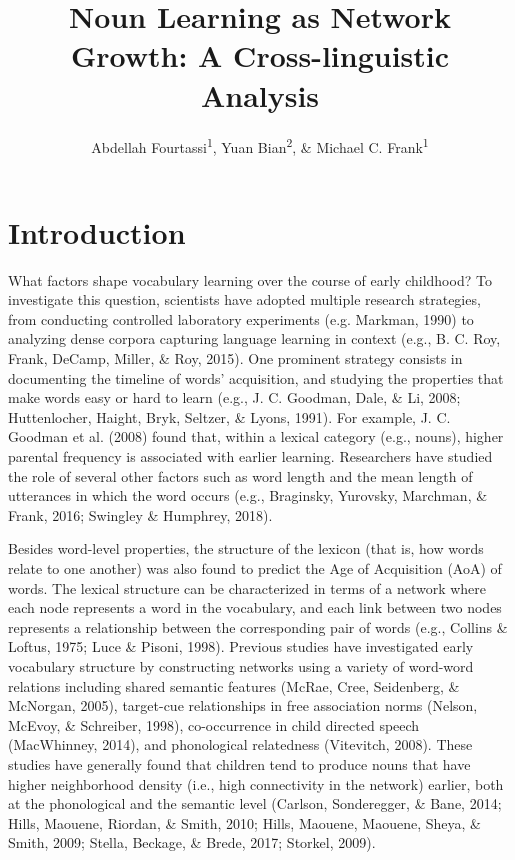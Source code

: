 \documentclass[english,floatsintext,man]{apa6}
\title{Noun Learning as Network Growth: A Cross-linguistic Analysis}
\author{Abdellah Fourtassi\textsuperscript{1}, Yuan Bian\textsuperscript{2}, \& Michael C. Frank\textsuperscript{1}}
\affiliation{
    \vspace{0.5cm}
          \textsuperscript{1} Department of Psychology, Stanford University\\
          \textsuperscript{2} Department of Psychology, University of Illinois  }
\theoremstyle{definition}
\theoremstyle{definition}
\theoremstyle{definition}
\theoremstyle{remark}
\begin{document}
\maketitle

\setcounter{secnumdepth}{0}



\section{Introduction}\label{introduction}

What factors shape vocabulary learning over the course of early
childhood? To investigate this question, scientists have adopted
multiple research strategies, from conducting controlled laboratory
experiments (e.g. Markman, 1990) to analyzing dense corpora capturing
language learning in context (e.g., B. C. Roy, Frank, DeCamp, Miller, \&
Roy, 2015). One prominent strategy consists in documenting the timeline
of words' acquisition, and studying the properties that make words easy
or hard to learn (e.g., J. C. Goodman, Dale, \& Li, 2008; Huttenlocher,
Haight, Bryk, Seltzer, \& Lyons, 1991). For example, J. C. Goodman et
al. (2008) found that, within a lexical category (e.g., nouns), higher
parental frequency is associated with earlier learning. Researchers have
studied the role of several other factors such as word length and the
mean length of utterances in which the word occurs (e.g., Braginsky,
Yurovsky, Marchman, \& Frank, 2016; Swingley \& Humphrey, 2018).

Besides word-level properties, the structure of the lexicon (that is,
how words relate to one another) was also found to predict the Age of
Acquisition (AoA) of words. The lexical structure can be characterized
in terms of a network where each node represents a word in the
vocabulary, and each link between two nodes represents a relationship
between the corresponding pair of words (e.g., Collins \& Loftus, 1975;
Luce \& Pisoni, 1998). Previous studies have investigated early
vocabulary structure by constructing networks using a variety of
word-word relations including shared semantic features (McRae, Cree,
Seidenberg, \& McNorgan, 2005), target-cue relationships in free
association norms (Nelson, McEvoy, \& Schreiber, 1998), co-occurrence in
child directed speech (MacWhinney, 2014), and phonological relatedness
(Vitevitch, 2008). These studies have generally found that children tend
to produce nouns that have higher neighborhood density (i.e., high
connectivity in the network) earlier, both at the phonological and the
semantic level (Carlson, Sonderegger, \& Bane, 2014; Hills, Maouene,
Riordan, \& Smith, 2010; Hills, Maouene, Maouene, Sheya, \& Smith, 2009;
Stella, Beckage, \& Brede, 2017; Storkel, 2009).
\end{document}
